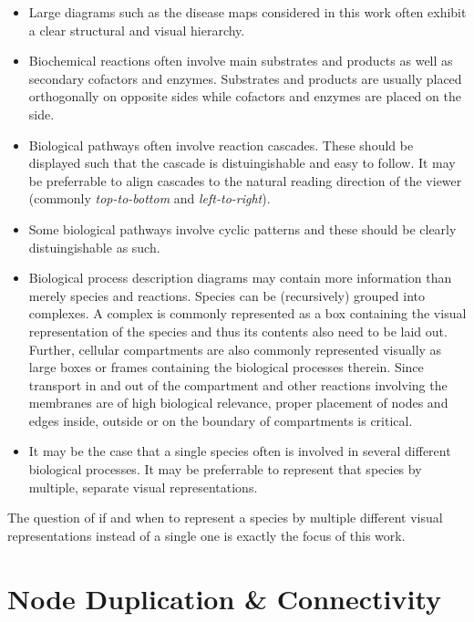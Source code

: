 \documentclass[
	fontsize=10pt, %
	twoside=false, %
	secnumdepth=1, %
  toc=indentunnumbered %
]{kaobook}
\begin{document}
\begin{itemize}
 \item Large diagrams such as the disease maps considered in this work often
   exhibit a clear structural and visual hierarchy.
 \item Biochemical reactions often involve main substrates and products as well
   as secondary cofactors and enzymes. Substrates and products are usually
   placed orthogonally on opposite sides while cofactors and enzymes are
   placed on the side.
 \item Biological pathways often involve reaction cascades. These should be
   displayed such that the cascade is distuingishable and easy to follow.
   It may be preferrable to align cascades to the natural reading direction of
   the viewer (commonly \textit{top-to-bottom} and \textit{left-to-right}).
 \item Some biological pathways involve cyclic patterns and these should be
   clearly distuingishable as such.
\item Biological process description diagrams may contain more information
  than merely species and reactions. Species can be (recursively) grouped
  into complexes. A complex is commonly represented as a box containing the
  visual representation of the species and thus its contents also need to be
  laid out. Further, cellular compartments are also commonly represented
  visually as large boxes or frames containing the biological processes
  therein. Since transport in and out of the compartment and other reactions
  involving the membranes are of high biological relevance, proper placement
  of nodes and edges inside, outside or on the boundary of compartments is critical.
\item It may be the case that a single species often is involved in several
  different biological processes. It may be preferrable to represent that
  species by multiple, separate visual representations.
\end{itemize}

The question of if and when to represent a species by multiple different visual
representations instead of a single one is exactly the focus of this work.


\section{Node Duplication \& Connectivity}
\end{document}
